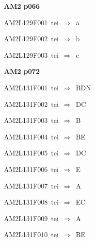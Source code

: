\par\vfill\eject
{\bf\hfill AM2 p066\hfill\hbox{}}\par\bigskip
{\sixrm AM2L129F001\ {\sixit tei}\ }$\Rightarrow$\ {\tenit a}\par\smallskip
{\sixrm AM2L129F002\ {\sixit tei}\ }$\Rightarrow$\ {\tenit b}\par\smallskip
{\sixrm AM2L129F003\ {\sixit tei}\ }$\Rightarrow$\ {\tenit c}\par\smallskip

\par\vfill\eject
{\bf\hfill AM2 p072\hfill\hbox{}}\par\bigskip
{\sixrm AM2L131F001\ {\sixit tei}\ }$\Rightarrow$\ BDN\par\smallskip
{\sixrm AM2L131F002\ {\sixit tei}\ }$\Rightarrow$\ DC\par\smallskip
{\sixrm AM2L131F003\ {\sixit tei}\ }$\Rightarrow$\ B\par\smallskip
{\sixrm AM2L131F004\ {\sixit tei}\ }$\Rightarrow$\ BE\par\smallskip
{\sixrm AM2L131F005\ {\sixit tei}\ }$\Rightarrow$\ DC\par\smallskip
{\sixrm AM2L131F006\ {\sixit tei}\ }$\Rightarrow$\ E\par\smallskip
{\sixrm AM2L131F007\ {\sixit tei}\ }$\Rightarrow$\ {\tenit A}\par\smallskip
{\sixrm AM2L131F008\ {\sixit tei}\ }$\Rightarrow$\ EC\par\smallskip
{\sixrm AM2L131F009\ {\sixit tei}\ }$\Rightarrow$\ {\tenit A}\par\smallskip
{\sixrm AM2L131F010\ {\sixit tei}\ }$\Rightarrow$\ BE\par\smallskip

